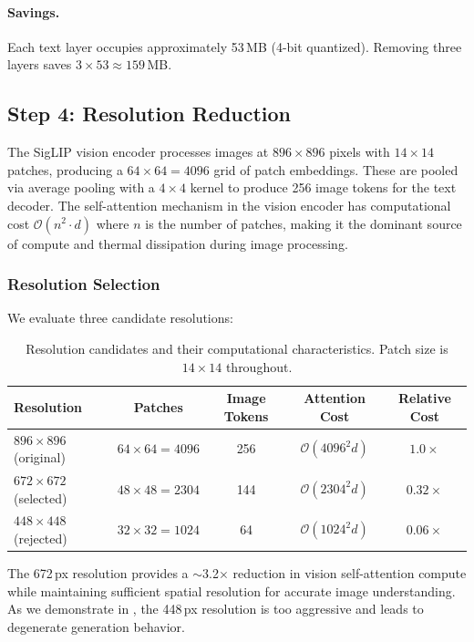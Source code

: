 \documentclass[11pt]{article}
\begin{document}
\paragraph{Savings.} Each text layer occupies approximately 53\,MB (4-bit quantized). Removing three layers saves $3 \times 53 \approx 159$\,MB.

\subsection{Step 4: Resolution Reduction}
\label{sec:resolution}

The SigLIP vision encoder processes images at $896 \times 896$ pixels with $14 \times 14$ patches, producing a $64 \times 64 = 4096$ grid of patch embeddings. These are pooled via average pooling with a $4\times4$ kernel to produce 256 image tokens for the text decoder. The self-attention mechanism in the vision encoder has computational cost $\mathcal{O}(n^2 \cdot d)$ where $n$ is the number of patches, making it the dominant source of compute and thermal dissipation during image processing.

\subsubsection{Resolution Selection}

We evaluate three candidate resolutions:

\begin{table}[h]
\centering
\caption{Resolution candidates and their computational characteristics. Patch size is $14\times14$ throughout.}
\label{tab:resolution}
\begin{tabular}{@{}lcccc@{}}
\toprule
Resolution & Patches & Image Tokens & Attention Cost & Relative Cost \\
\midrule
$896\times896$ (original) & $64\times64=4096$ & 256 & $\mathcal{O}(4096^2 d)$ & $1.0\times$ \\
$672\times672$ (selected) & $48\times48=2304$ & 144 & $\mathcal{O}(2304^2 d)$ & $0.32\times$ \\
$448\times448$ (rejected) & $32\times32=1024$ & 64 & $\mathcal{O}(1024^2 d)$ & $0.06\times$ \\
\bottomrule
\end{tabular}
\end{table}

The 672\,px resolution provides a $\sim$3.2$\times$ reduction in vision self-attention compute while maintaining sufficient spatial resolution for accurate image understanding. As we demonstrate in , the 448\,px resolution is too aggressive and leads to degenerate generation behavior.
\end{document}

